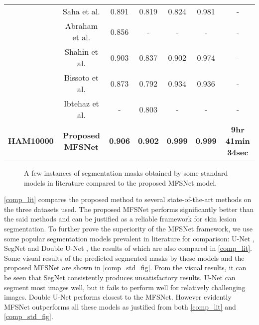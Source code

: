 \documentclass[review]{elsarticle}
\begin{document}
\begin{table}[]
{\begin{tabular}{|c|c|c|c|c|c|c|}
 & Saha et al. \cite{saha2020leveraging}         & 0.891 & 0.819 & 0.824  & 0.981 & -                        \\ \cline{2-7} 
 & Abraham et al. \cite{abraham2019novel}        & 0.856 & -     & -      & -     & -                        \\ \cline{2-7} 
 & Shahin et al. \cite{shahin2019deep}           & 0.903 & 0.837 & 0.902  & 0.974 & -                        \\ \cline{2-7} 
 & Bissoto et al. \cite{bissoto2018deep}         & 0.873 & 0.792 & 0.934  & 0.936 & -                        \\ \cline{2-7} 
 & Ibtehaz et al. \cite{ibtehaz2020multiresunet} & -     & 0.803 & -      & -     & -                        \\ \cline{2-7} 
\multirow{-9}{*}{\textbf{HAM10000}}  & \textbf{Proposed MFSNet} & \textbf{0.906} & \textbf{0.902} & \textbf{0.999} & \textbf{0.999} & \textbf{9hr 41min 34sec}     \\ \hline
\end{tabular}
}
\end{table}

\begin{figure*}
    \centering
    \caption{A few instances of segmentation masks obtained by some standard models in literature compared to the proposed MFSNet model.}
    \label{comp_std_fig}
\end{figure*}

\autoref{comp_lit} compares the proposed method to several state-of-the-art methods on the three datasets used. The proposed MFSNet performs significantly better than the said methods and can be justified as a reliable framework for skin lesion segmentation. To further prove the superiority of the MFSNet framework, we use some popular segmentation models prevalent in literature for comparison: U-Net \cite{ronneberger2015u}, SegNet \cite{badrinarayanan2017segnet} and Double U-Net \cite{jha2020doubleu}, the results of which are also compared in \autoref{comp_lit}. Some visual results of the predicted segmented masks by these models and the proposed MFSNet are shown in \autoref{comp_std_fig}. From the visual results, it can be seen that SegNet consistently produces unsatisfactory results. U-Net can segment most images well, but it fails to perform well for relatively challenging images. Double U-Net performs closest to the MFSNet. However evidently MFSNet outperforms all these models as justified from both \autoref{comp_lit} and \autoref{comp_std_fig}.
\end{document}
